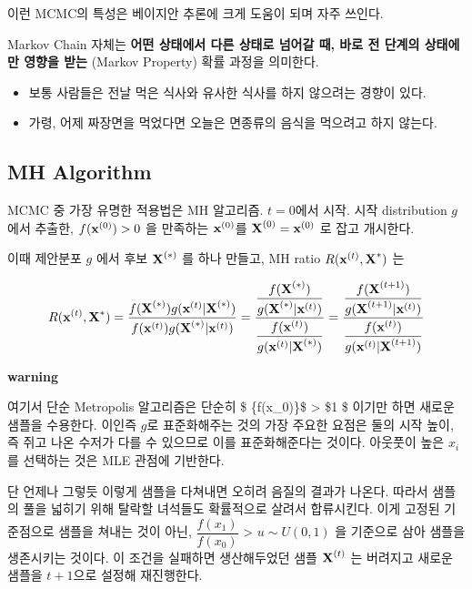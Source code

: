 \documentclass[
]{book}
\providecommand{\tightlist}{%
  \setlength{\itemsep}{0pt}\setlength{\parskip}{0pt}}
\begin{document}
이런 MCMC의 특성은 베이지안 추론에 크게 도움이 되며 자주 쓰인다.

Markov Chain 자체는 \textbf{어떤 상태에서 다른 상태로 넘어갈 때, 바로 전 단계의 상태에만 영향을 받는} (Markov Property) 확률 과정을 의미한다.

\begin{itemize}
\tightlist
\item
  보통 사람들은 전날 먹은 식사와 유사한 식사를 하지 않으려는 경향이 있다.
\item
  가령, 어제 짜장면을 먹었다면 오늘은 면종류의 음식을 먹으려고 하지 않는다.
\end{itemize}

\hypertarget{mh-algorithm}{%
\subsection{MH Algorithm}\label{mh-algorithm}}

MCMC 중 가장 유명한 적용법은 MH 알고리즘. \(t=0\)에서 시작. 시작 distribution \(g\)에서 추출한, \(f(\textbf x^{(0)} )> 0\) 을 만족하는 \(\textbf x^{(0)}\)를 \(\textbf X^{(0)} = \textbf x^{(0)}\) 로 잡고 개시한다.

이때 제안분포 \(g\) 에서 후보 \(\textbf X^{( \ast )}\) 를 하나 만들고, MH ratio \(R (\textbf {x}^{(t)}, \textbf X^{\ast} )\) 는

\[
R (\textbf {x}^{(t)}, \textbf X^{\ast} ) 
= \dfrac 
{f(\textbf X^{( \ast )}) g(\textbf x^{( t )} | \textbf X^{( \ast )})} 
{f(\textbf x^{( t )}) g(\textbf X^{( \ast )} | \textbf x^{( t )}) } 
=\dfrac
{\dfrac
{f(\textbf X^{( \ast )})}
{g(\textbf X^{( \ast )} | \textbf x^{( t )})}
}
{\dfrac
{f(\textbf x^{( t )})}
{g(\textbf x^{( t )} | \textbf X^{( \ast )})}
}
=\dfrac
{\dfrac
{f(\textbf X^{( t+1 )})}
{g(\textbf X^{( t+1 )} | \textbf x^{( t )})}
}
{\dfrac
{f(\textbf x^{( t )})}
{g(\textbf x^{( t )} | \textbf X^{( t+1 )})}
}
\]

\textbf{warning}

여기서 단순 Metropolis 알고리즘은 단순히 \$  \{f(x\_0)\}\$ \textgreater{} \$1 \$ 이기만 하면 새로운 샘플을 수용한다. 이인즉 \(g\)로 표준화해주는 것의 가장 주요한 요점은 둘의 시작 높이, 즉 쥐고 나온 수저가 다를 수 있으므로 이를 표준화해준다는 것이다. 아웃풋이 높은 \(x_i\)를 선택하는 것은 MLE 관점에 기반한다.

단 언제나 그렇듯 이렇게 샘플을 다쳐내면 오히려 음질의 결과가 나온다. 따라서 샘플의 풀을 넓히기 위해 탈락할 녀석들도 확률적으로 살려서 합류시킨다. 이게 고정된 기준점으로 샘플을 쳐내는 것이 아닌, \(\dfrac {f(x_1)} {f(x_0)}\) \textgreater{} \(u \sim U {(0,1)}\) 을 기준으로 삼아 샘플을 생존시키는 것이다. 이 조건을 실패하면 생산해두었던 샘플 \(\textbf X^{(t)}\) 는 버려지고 새로운 샘플을 \(t+1\)으로 설정해 재진행한다.
\end{document}
